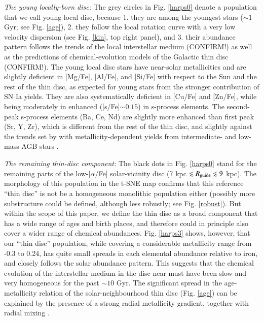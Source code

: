 \documentclass{aa}  %
\begin{document}
{\it The young locally-born disc:} The grey circles in Fig. \ref{harps0} denote a population that we call young local disc, because 1. they are among the youngest stars ($\sim1$ Gyr; see Fig. \ref{age}), 2. they follow the local rotation curve with a very low velocity dispersion (see Fig. \ref{kin}, top right panel), and 3. their abundance pattern follows the trends of the local interstellar medium (CONFIRM!) as well as the predictions of chemical-evolution models of the Galactic thin disc (CONFIRM!). The young local disc stars have near-solar metallicities and are slightly deficient in [Mg/Fe], [Al/Fe], and [Si/Fe] with respect to the Sun and the rest of the thin disc, as expected for young stars from the stronger contribution of SN Ia yields. They are also systematically deficient in [Cu/Fe] and [Zn/Fe], while being moderately in enhanced ([s/Fe]$\sim0.15$) in s-process elements. The second-peak s-process elements (Ba, Ce, Nd) are slightly more enhanced than first peak (Sr, Y, Zr), which is different from the rest of the thin disc, and slightly against the trends set by with metallicity-dependent yields from intermediate- and low-mass AGB stars \citep[e.g.][]{Cristallo2009, Cristallo2015, daSilva2016, DelgadoMena2017}.

{\it The remaining thin-disc component:} The black dots in Fig. \ref{harps0} stand for the remaining parts of the low-[$\alpha$/Fe] solar-vicinity disc (7 kpc $\lesssim R_{\rm guide}\lesssim9$ kpc). The morphology of this population in the t-SNE map confirms that this reference ``thin disc'' is not be a homogeneous monolithic population either (possibly more substructure could be defined, although less robustly; see Fig. \ref{robust}). But within the scope of this paper, we define the thin disc as a broad component that has a wide range of ages and birth places, and therefore could in principle also cover a wider range of chemical abundances. Fig. \ref{harps3} shows, however, that our ``thin disc'' population, while covering a considerable metallicity range from -0.3 to 0.24, has quite small spreads in each elemental abundance relative to iron, and closely follows the solar abundance pattern. This suggests that the chemical evolution of the interstellar medium in the disc near must have been slow and very homogeneous for the past $\sim10$ Gyr. The significant spread in the age-metallicity relation of the solar-neighbourhood thin disc (Fig. \ref{age}) can be explained by the presence of a strong radial metallicity gradient, together with radial mixing \citep[e.g.][Minchev et al., in prep.]{Haywood2006, Minchev2013, Anders2017a}.
\end{document}
